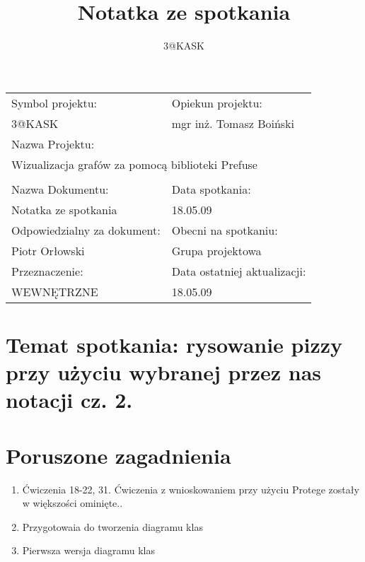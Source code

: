 \documentclass[a4paper,10pt]{article}
\title{Notatka ze spotkania}
\author{3@KASK}
\begin{document}



\maketitle


\begin{center}
\begin{tabular}{|p{7cm}|p{7cm}|}
\hline
Symbol projektu: & Opiekun projektu:   \tabularnewline 
3@KASK & mgr inż. Tomasz Boiński    \tabularnewline \hline
\multicolumn{2}{|l|}{Nazwa Projektu: } \tabularnewline
\multicolumn{2}{|l|}{Wizualizacja grafów za pomocą biblioteki Prefuse } \tabularnewline 
\hline
\multicolumn{2}{l}{ } \tabularnewline %
\hline 
Nazwa Dokumentu: & Data spotkania:   \tabularnewline 
Notatka ze spotkania & 18.05.09 \tabularnewline \hline
Odpowiedzialny za dokument: & Obecni na spotkaniu:   \tabularnewline 
Piotr Orłowski & Grupa projektowa \tabularnewline \hline
Przeznaczenie: & Data ostatniej aktualizacji:   \tabularnewline 
WEWNĘTRZNE & 18.05.09 \tabularnewline \hline
\end{tabular}
\end{center}



\section{Temat spotkania: rysowanie pizzy przy użyciu wybranej przez nas notacji cz. 2.}


\section{Poruszone zagadnienia}
\begin{enumerate}
\item Ćwiczenia 18-22, 31. Ćwiczenia z wnioskowaniem przy użyciu Protege zostały w większości ominięte..
\item Przygotowaia do tworzenia diagramu klas
\item Pierwsza wersja diagramu klas
\end{enumerate}
\end{document}
